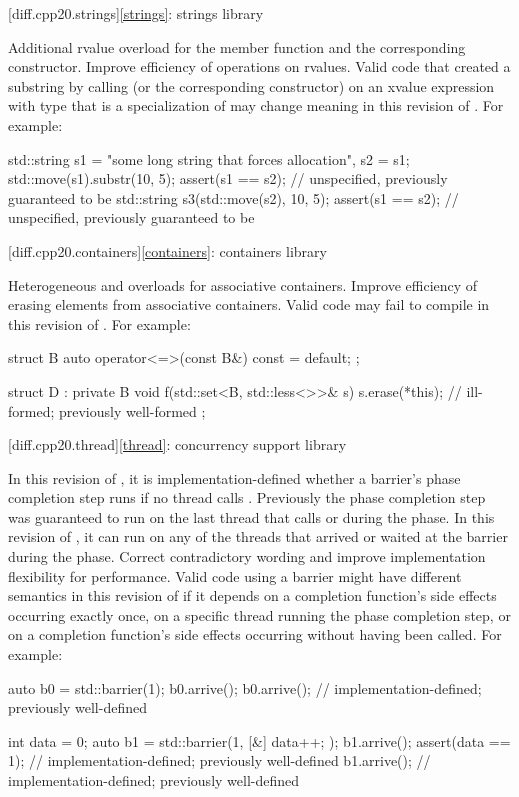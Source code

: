 [diff.cpp20.strings]{\ref{strings}: strings library}

\change
Additional rvalue overload for the  member function and
the corresponding constructor.
\rationale
Improve efficiency of operations on rvalues.
\effect
Valid \CppXX{} code that created a substring
by calling  (or the corresponding constructor)
on an xvalue expression with type 
that is a specialization of 
may change meaning in this revision of \Cpp{}.
For example:
\begin{codeblock}
std::string s1 = "some long string that forces allocation", s2 = s1;
std::move(s1).substr(10, 5);
assert(s1 == s2);       // unspecified, previously guaranteed to be 
std::string s3(std::move(s2), 10, 5);
assert(s1 == s2);       // unspecified, previously guaranteed to be 
\end{codeblock}

[diff.cpp20.containers]{\ref{containers}: containers library}

\change
Heterogeneous  and  overloads
for associative containers.
\rationale
Improve efficiency of erasing elements from associative containers.
\effect
Valid \CppXX{} code may fail to compile in this revision of \Cpp{}.
For example:
\begin{codeblock}
struct B {
  auto operator<=>(const B&) const = default;
};

struct D : private B {
  void f(std::set<B, std::less<>>& s) {
    s.erase(*this);             // ill-formed; previously well-formed
  }
};
\end{codeblock}

[diff.cpp20.thread]{\ref{thread}: concurrency support library}

\change
In this revision of \Cpp{},
it is implementation-defined whether a barrier's phase completion step runs
if no thread calls .
Previously the phase completion step was guaranteed to run on the last thread that calls  or  during the phase.
In this revision of \Cpp{},
it can run on any of the threads that arrived or waited at the barrier
during the phase.
\rationale
Correct contradictory wording and
improve implementation flexibility for performance.
\effect
Valid \CppXX{} code using a barrier might have
different semantics in this revision of \Cpp{}
if it depends on a completion function's side effects occurring exactly once,
on a specific thread running the phase completion step, or
on a completion function's side effects occurring
without  having been called.
For example:
\begin{codeblock}
auto b0 = std::barrier(1);
b0.arrive();
b0.arrive();            // implementation-defined; previously well-defined

int data = 0;
auto b1 = std::barrier(1, [&] { data++; });
b1.arrive();
assert(data == 1);      // implementation-defined; previously well-defined
b1.arrive();            // implementation-defined; previously well-defined
\end{codeblock}

